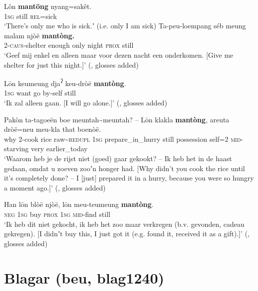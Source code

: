 \begin{exe}	\ex\label{exAppendixAcehneseRestrictive1}
	\gll Lôn \textbf{mantöng} nyang=sakêt.\\
	1\textsc{sg} still \textsc{rel}=sick\\
	\glt \lq There’s only me who is sick.ʼ (i.e. only I am sick) \parencite[229]{Durie1985}	
	\ex\label{exAppendixAcehneseRestrictive2}
	\gll Ta-peu-loempang séb meung malam njòë \textbf{mantòng.}\\
	2-\textsc{caus}-shelter enough only night \textsc{prox} still\\
	\glt \lq Geef mij enkel en alleen maar voor dezen nacht een onderkomen. [Give me shelter for just this night.]\rq{ }(\cite[280]{Kreemer1931}, glosses added)

	\ex\label{exAppendixAcehneseRestrictive3}
	\gll Lōn keumeung dja\textsuperscript{ʔ} keu-dròë \textbf{mantòng}.\\
	1\textsc{sg} want go by-self still\\
	\glt \lq Ik zal alleen gaan. [I will go alone.]\rq{ }(\cite[175]{Kreemer1931}, glosses added)
	
	\ex\label{exAppendixAcehneseRestrictive4}
	\gll Pakòn ta-tagoeën boe meuntah\sim meuntah? – Lōn klakla \textbf{mantòng}, areuta dròë=neu meu-kla that boenòë.\\
	why 2-cook rice raw\sim\textsc{redupl} {} 1\textsc{sg} prepare\_in\_hurry still possession self=2 \textsc{mid}-starving very earlier\_today\\
	\glt \lq Waarom heb je de rijst niet (goed) gaar gekookt?  -- Ik heb het in de haast gedaan, omdat u zoeven zooʼn honger had. [Why didn't you cook the rice until it's completely done? -- I [just] prepared it in a hurry, because you were so hungry a moment ago.]\rq{ }(\cite[764–765]{DjajadiningratVol1}, glosses added)

	\ex\label{exAppendixAcehneseRestrictive5}
	\gll Han lōn blòë njòë, lōn meu-teumeung \textbf{mantòng}.\\
	\textsc{neg} 1\textsc{sg} buy \textsc{prox} 1\textsc{sg} \textsc{mid}-find still\\
	\glt \lq Ik heb dit niet gekocht, ik heb het zoo maar verkregen (b.v. gevonden, cadeau gekregen). [I didnʼt buy this, I just got it (e.g. found it, received it as a gift).]\rq{ }(\cite[30]{DjajadiningratVol2}, glosses added)
\end{exe}

\section{Blagar (beu, blag1240)}
